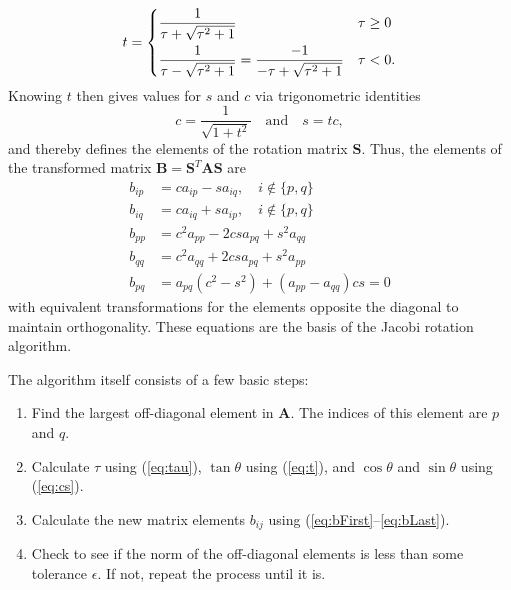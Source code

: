 \documentclass[aps,prc,reprint]{revtex4-1}
\begin{document}
        \begin{equation}
            t = \begin{dcases}
                \frac{1}{\tau + \sqrt{\tau^2 + 1}} & \tau \geq 0 \\
                \frac{1}{\tau - \sqrt{\tau^2 + 1}} = \frac{-1}{-\tau + \sqrt{\tau^2 + 1}} & \tau < 0. \\
            \end{dcases}
            \label{eq:t}
        \end{equation}
        Knowing $t$ then gives values for $s$ and $c$ via trigonometric identities
        \begin{equation}
            c = \frac{1}{\sqrt{1 + t^2}} \quad \text{and}\quad s = tc, \label{eq:cs}
        \end{equation}
        and thereby defines the elements of the rotation matrix $\mathbf{S}$. Thus, the elements of the transformed matrix $\mathbf{B} = \mathbf{S}^T \mathbf{A} \mathbf{S}$ are
        \begin{align}
            b_{ip} &= ca_{ip} - sa_{iq}, \quad i \notin \{p, q\} \label{eq:bFirst}\\
            b_{iq} &= ca_{iq} + sa_{ip}, \quad i \notin \{p, q\} \\
            b_{pp} &= c^2 a_{pp} - 2csa_{pq} + s^2 a_{qq} \\
            b_{qq} &= c^2 a_{qq} + 2csa_{pq} + s^2 a_{pp} \\
            b_{pq} &= a_{pq}(c^2-s^2) + (a_{pp} - a_{qq}) cs = 0 \label{eq:bLast}
        \end{align}
        with equivalent transformations for the elements opposite the diagonal to maintain orthogonality. These equations are the basis of the Jacobi rotation algorithm.

        The algorithm itself consists of a few basic steps:
        \begin{enumerate}
            \item Find the largest off-diagonal element in $\mathbf{A}$. The indices of this element are $p$ and $q$.
            \item Calculate $\tau$ using (\ref{eq:tau}), $\tan\theta$ using (\ref{eq:t}), and $\cos\theta$ and $\sin\theta$ using (\ref{eq:cs}).
            \item Calculate the new matrix elements $b_{ij}$ using (\ref{eq:bFirst}--\ref{eq:bLast}).
            \item Check to see if the norm of the off-diagonal elements is less than some tolerance $\epsilon$. If not, repeat the process until it is.
        \end{enumerate}
\end{document}
